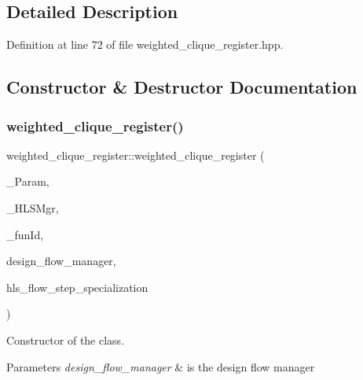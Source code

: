 \subsection{Detailed Description}


Definition at line 72 of file weighted\+\_\+clique\+\_\+register.\+hpp.



\subsection{Constructor \& Destructor Documentation}
\mbox{\label{classweighted__clique__register_a19fe57763a2e1ea8ca41c3cf53251e06}} 
\subsubsection{\texorpdfstring{weighted\+\_\+clique\+\_\+register()}{weighted\_clique\_register()}}
{\footnotesize\ttfamily weighted\+\_\+clique\+\_\+register\+::weighted\+\_\+clique\+\_\+register (\begin{DoxyParamCaption}\item[{const \hyperlink{Parameter_8hpp_a37841774a6fcb479b597fdf8955eb4ea}{Parameter\+Const\+Ref}}]{\+\_\+\+Param,  }\item[{const \hyperlink{hls__manager_8hpp_acd3842b8589fe52c08fc0b2fcc813bfe}{H\+L\+S\+\_\+manager\+Ref}}]{\+\_\+\+H\+L\+S\+Mgr,  }\item[{unsigned int}]{\+\_\+fun\+Id,  }\item[{const Design\+Flow\+Manager\+Const\+Ref}]{design\+\_\+flow\+\_\+manager,  }\item[{const \hyperlink{hls__step_8hpp_a5fdd2edf290c196531d21d68e13f0e74}{H\+L\+S\+Flow\+Step\+Specialization\+Const\+Ref}}]{hls\+\_\+flow\+\_\+step\+\_\+specialization }\end{DoxyParamCaption})}



Constructor of the class. 


\begin{DoxyParams}{Parameters}
{\em design\+\_\+flow\+\_\+manager} & is the design flow manager \\
\hline
\end{DoxyParams}


